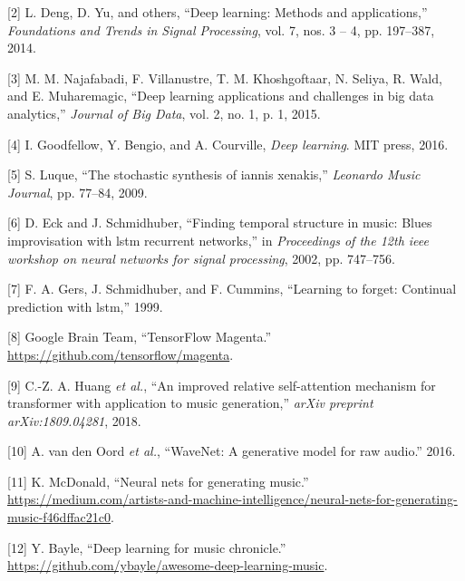 \documentclass[12pt,]{article}
\begin{document}
\leavevmode\hypertarget{ref-deng2014deep}{}%
{[}2{]} L. Deng, D. Yu, and others, ``Deep learning: Methods and
applications,'' \emph{Foundations and Trends in Signal Processing}, vol.
7, nos. 3 -- 4, pp. 197--387, 2014.

\leavevmode\hypertarget{ref-najafabadi2015deep}{}%
{[}3{]} M. M. Najafabadi, F. Villanustre, T. M. Khoshgoftaar, N. Seliya,
R. Wald, and E. Muharemagic, ``Deep learning applications and challenges
in big data analytics,'' \emph{Journal of Big Data}, vol. 2, no. 1, p.
1, 2015.

\leavevmode\hypertarget{ref-goodfellow2016deep}{}%
{[}4{]} I. Goodfellow, Y. Bengio, and A. Courville, \emph{Deep
learning}. MIT press, 2016.

\leavevmode\hypertarget{ref-luque2009stochastic}{}%
{[}5{]} S. Luque, ``The stochastic synthesis of iannis xenakis,''
\emph{Leonardo Music Journal}, pp. 77--84, 2009.

\leavevmode\hypertarget{ref-eck2002finding}{}%
{[}6{]} D. Eck and J. Schmidhuber, ``Finding temporal structure in
music: Blues improvisation with lstm recurrent networks,'' in
\emph{Proceedings of the 12th ieee workshop on neural networks for
signal processing}, 2002, pp. 747--756.

\leavevmode\hypertarget{ref-gers1999learning}{}%
{[}7{]} F. A. Gers, J. Schmidhuber, and F. Cummins, ``Learning to
forget: Continual prediction with lstm,'' 1999.

\leavevmode\hypertarget{ref-magenta}{}%
{[}8{]} \relax Google Brain Team, ``TensorFlow Magenta.''
\url{https://github.com/tensorflow/magenta}.

\leavevmode\hypertarget{ref-huang2018improved}{}%
{[}9{]} C.-Z. A. Huang \emph{et al.}, ``An improved relative
self-attention mechanism for transformer with application to music
generation,'' \emph{arXiv preprint arXiv:1809.04281}, 2018.

\leavevmode\hypertarget{ref-oord2016wavenet}{}%
{[}10{]} A. van den Oord \emph{et al.}, ``WaveNet: A generative model
for raw audio.'' 2016.

\leavevmode\hypertarget{ref-mediumkylemcdonald}{}%
{[}11{]} K. McDonald, ``Neural nets for generating music.'' \\
\url{https://medium.com/artists-and-machine-intelligence/neural-nets-for-generating-music-f46dffac21c0}.

\leavevmode\hypertarget{ref-libdlmusic}{}%
{[}12{]} Y. Bayle, ``Deep learning for music chronicle.'' \\
\url{https://github.com/ybayle/awesome-deep-learning-music}.
\end{document}
